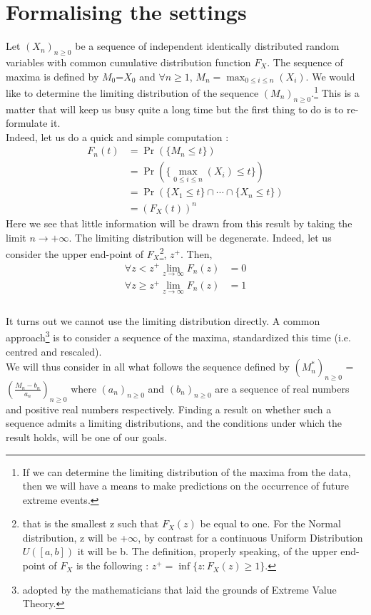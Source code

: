 \section{Formalising the settings}
Let $(X_n)_{n \ge 0}$ be a sequence of independent identically distributed random variables with common cumulative distribution function $F_X$. The sequence of maxima is defined by $M_0$=$X_0$ and $\forall n \ge 1$, $M_n = \max_{0 \le i \le n}(X_i)$. We would like to determine the limiting distribution of the sequence $(M_n)_{n \ge 0}$.\footnote{If we can determine the limiting distribution of the maxima from the data, then we will have a means to make predictions on the occurrence of future extreme events.} This is a matter that will keep us busy quite a long time but the first thing to do is to re-formulate it. \\ [4 pt]
Indeed, let us do a quick and simple computation :\\
\begin{equation}
\begin{aligned}
	F_n(t) &= \Pr(\{M_n \le t\}) \\
              &= \Pr(\{\max_{0 \le i \le n}(X_i) \le t\}) \\
              &= \Pr(\{X_1 \le t\} \cap \cdots \cap \{X_n \le t\}) \\
              &= (F_X(t))^n
\end{aligned}
\end{equation}
Here we see that little information will be drawn from this result by taking the limit $n \longrightarrow +\infty$. The limiting distribution will be degenerate. Indeed, let us consider the upper end-point of $F_X$\footnote{that is the smallest z such that $F_X(z)$ be equal to one. For the Normal distribution, z will be +$\infty$, by contrast for a continuous Uniform Distribution $U([a,b])$ it will be b. The definition, properly speaking, of the upper end-point of $F_X$ is the following : $z^{+} = \inf\{z : F_X(z) \ge 1\}$.}, $z^{+}$. Then,
\begin{equation}
\begin{aligned}
\forall z < z^{+} \lim_{z\to\infty} F_n(z) &= 0 \\
\forall z \ge z^{+} \lim_{z\to\infty} F_n(z) &= 1 \\
\end{aligned}
\end{equation}
\\[4 pt]
It turns out we cannot use the limiting distribution directly. A common approach\footnote{adopted by the mathematicians that laid the grounds of Extreme Value Theory.} is to consider a sequence of the maxima, standardized this time (i.e. centred and rescaled).\\[4 pt] 
We will thus consider in all what follows the sequence defined by $(M^{*}_n)_{n \ge 0}$ = $(\frac{M_n - b_n}{a_n})_{n \ge 0}$ where $(a_n)_{n \ge 0}$ and $(b_n)_{n \ge 0}$ are a sequence of real numbers and positive real numbers respectively. Finding a result on whether such a sequence admits a limiting distributions, and the conditions under which the result holds, will be one of our goals.
